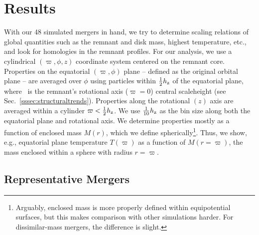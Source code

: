 \section{Results}
\label{sec:results}

With our 48 simulated mergers in hand, we try to determine scaling relations of global quantities such as the remnant and disk mass, highest temperature, etc., and look for homologies in the remnant profiles.  For our analysis, we use a cylindrical $(\varpi,\phi,z)$ coordinate system centered on the remnant core.  Properties on the equatorial $(\varpi,\phi)$ plane -- defined as the original orbital plane -- are averaged over $\phi$ using particles within $\frac{1}{2}\hz$ of the equatorial plane, where \hz\ is the remnant's rotational axis ($\varpi = 0$) central scaleheight (see Sec.~\ref{sssec:structuraltrends}).  Properties along the rotational $(z)$ axis are averaged within a cylinder $\varpi<\frac{1}{2}\hz$.  We use $\frac{1}{10}\hz$ as the bin size along both the equatorial plane and rotational axis.  We determine properties mostly as a function of enclosed mass $M(r)$, which we define spherically\footnote{Arguably, enclosed mass is more properly defined within equipotential surfaces, but this makes comparison with other simulations harder.  For dissimilar-mass mergers, the difference is slight.}.  Thus, we show, e.g., equatorial plane temperature $T(\varpi)$ as a function of $M(r=\varpi)$, the mass enclosed within a sphere with radius $r=\varpi$.

\subsection{Representative Mergers}
\label{ssec:samplingofmergers}

